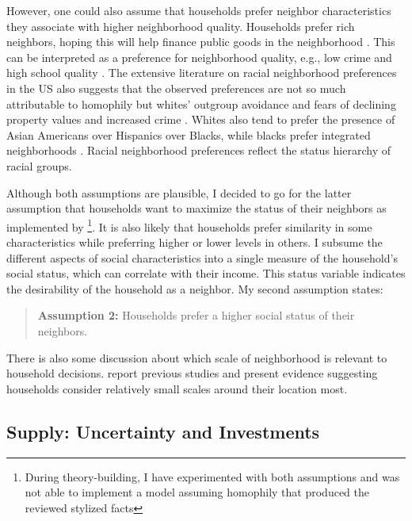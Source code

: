 \documentclass[a4paper,12pt]{article}
\begin{document}
However, one could also assume that households prefer neighbor characteristics they associate with higher neighborhood quality. Households prefer rich neighbors, hoping this will help finance public goods in the neighborhood \citep{bayerUnifiedFrameworkMeasuring2007, bruchChoiceSetFormation2019}. This can be interpreted as a preference for neighborhood quality, e.g., low crime and high school quality \citep{bayerUnifiedFrameworkMeasuring2007, mummoloWhyPartisansNot2017}. The extensive literature on racial neighborhood preferences in the US also suggests that the observed preferences are not so much attributable to homophily but whites' outgroup avoidance and fears of declining property values and increased crime \citep{krysanDoesRaceMatter2009}. Whites also tend to prefer the presence of Asian Americans over Hispanics over Blacks, while blacks prefer integrated neighborhoods \citep{charlesDynamicsRacialResidential2003}. Racial neighborhood preferences reflect the status hierarchy of racial groups.

Although both assumptions are plausible, I decided to go for the latter assumption that households want to maximize the status of their neighbors as implemented by \citet{benardWealthStatusBasedModel2007}\footnote{During theory-building, I have experimented with both assumptions and was not able to implement a model assuming homophily that produced the reviewed stylized facts}. It is also likely that households prefer similarity in some characteristics while preferring higher or lower levels in others. I subsume the different aspects of social characteristics into a single measure of the household's social status, which can correlate with their income. This status variable indicates the desirability of the household as a neighbor. My second assumption states:

\begin{quotation}
\textbf{Assumption 2:} Households prefer a higher social status of their neighbors.
\end{quotation}

There is also some discussion about which scale of neighborhood is relevant to household decisions. \citet{loganBirdsFeatherSocial2016} report previous studies and present evidence suggesting households consider relatively small scales around their location most. 


\subsection{Supply: Uncertainty and Investments}
\end{document}
